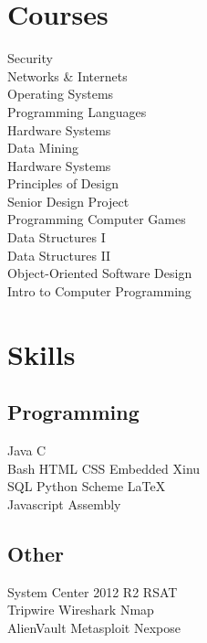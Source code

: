 \documentclass[letterpaper]{deedy-resume} %
\begin{document}
\begin{minipage}[t]{0.33\textwidth}
\section{Courses}

Security \\
Networks \& Internets \\
Operating Systems \\
Programming Languages \\
Hardware Systems \\
Data Mining \\
Hardware Systems \\
Principles of Design \\
Senior Design Project \\
Programming Computer Games \\
Data Structures I \\
Data Structures II \\
Object-Oriented Software Design \\
Intro to Computer Programming \\

\sectionspace %


\section{Skills}

\subsection{Programming}

Java \textbullet{} C \\
Bash \textbullet{} HTML \textbullet{} CSS \textbullet{} Embedded Xinu \\
SQL \textbullet{} Python \textbullet{} Scheme \textbullet{} LaTeX \\
Javascript \textbullet{} Assembly
\sectionspace %
\subsection{Other}
System Center 2012 R2 \textbullet{} RSAT \\
Tripwire \textbullet{} Wireshark \textbullet{} Nmap \\
AlienVault \textbullet{} Metasploit \textbullet{} Nexpose
\sectionspace %


\end{minipage}
\end{document}
